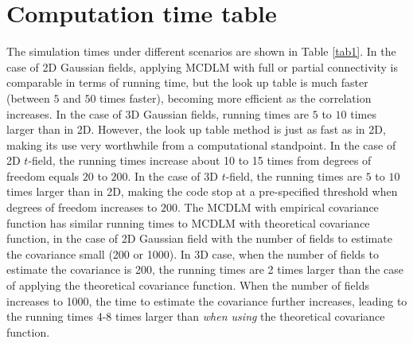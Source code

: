 \documentclass{article}
\newcommand{\nt}[1]{\textit{\color{red} #1}}
\begin{document}
\section{Computation time table\label{appendix.g}}
The simulation times under different scenarios are shown in Table \ref{tab1}. In the case of 2D Gaussian fields, applying MCDLM with full or partial connectivity is comparable in terms of running time, but the look up table is much faster (between $5$ and $50$ times faster), becoming more efficient as the correlation increases. In the case of 3D Gaussian fields, running times are $5$ to $10$ times larger than in 2D. However, the look up table method is just as fast as in 2D, making its use very worthwhile from a computational standpoint. In the case of 2D $t$-field, the running times increase about 10 to 15 times from degrees of freedom equals $20$ to $200$. In the case of 3D $t$-field, the running times are $5$ to $10$ times larger than in 2D, making the code stop at a pre-specified threshold when degrees of freedom increases to $200$. The MCDLM with empirical covariance function has similar running times to MCDLM with theoretical covariance function, in the case of 2D Gaussian field with the number of fields to estimate the covariance small (200 or 1000). In 3D case, when the number of fields to estimate the covariance is 200, the running times are 2 times larger than the case of applying the theoretical covariance function. When the number of fields increases to 1000, the time to estimate the covariance further increases, leading to the running times 4-8 times larger than \nt{when using} the theoretical covariance function.
\end{document}
